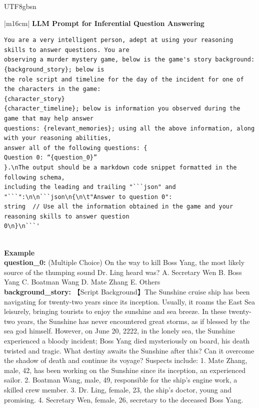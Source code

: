 \documentclass[11pt]{article}
\begin{document}
{\begin{CJK}{UTF8}{gbsn}
\begin{table}[ht!]
\begin{minipage}[t]{\linewidth}
\begin{tabular}{|m{16cm}|}
\hline
{}  {\textbf{LLM Prompt for Inferential Question Answering}} \\
\begin{minipage}[t]{\linewidth}
\small\begin{verbatim}
You are a very intelligent person, adept at using your reasoning skills to answer questions. You are
observing a murder mystery game, below is the game's story background: {background_story}; below is
the role script and timeline for the day of the incident for one of the characters in the game: 
{character_story}
{character_timeline}; below is information you observed during the game that may help answer 
questions: {relevant_memories}; using all the above information, along with your reasoning abilities,
answer all of the following questions: {
Question 0: “{question_0}”
}.\nThe output should be a markdown code snippet formatted in the following schema, 
including the leading and trailing "```json" and "```":\n\n```json\n{\n\t"Answer to question 0": 
string  // Use all the information obtained in the game and your reasoning skills to answer question
0\n}\n```'

\end{verbatim}
\end{minipage} \\
\hline
{}  \textbf{Example}  \\
 \textbf{  question\_0:} \small(Multiple Choice) On the way to kill Boss Yang, the most likely source of the thumping sound Dr. Ling heard was? A. Secretary Wen B. Boss Yang C. Boatman Wang D. Mate Zhang E. Others \\

  \textbf{  background\_story:} \small【Script Background】The Sunshine cruise ship has been navigating for twenty-two years since its inception. Usually, it roams the East Sea leisurely, bringing tourists to enjoy the sunshine and sea breeze. In these twenty-two years, the Sunshine has never encountered great storms, as if blessed by the sea god himself. However, on June 20, 2222, in the lonely sea, the Sunshine experienced a bloody incident; Boss Yang died mysteriously on board, his death twisted and tragic. What destiny awaits the Sunshine after this? Can it overcome the shadow of death and continue its voyage? Suspects include: 1. Mate Zhang, male, 42, has been working on the Sunshine since its inception, an experienced sailor. 2. Boatman Wang, male, 49, responsible for the ship's engine work, a skilled crew member. 3. Dr. Ling, female, 23, the ship's doctor, young and promising. 4. Secretary Wen, female, 26, secretary to the deceased Boss Yang.\\


\end{tabular}
\end{minipage}
\end{table}
\end{CJK}}
\end{document}
